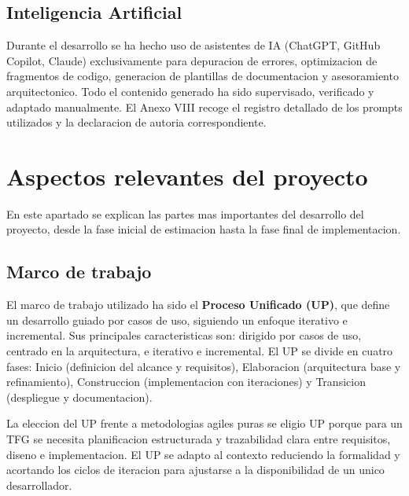 \documentclass[11pt, a4paper]{article}
\begin{document}
\subsection{Inteligencia Artificial}

Durante el desarrollo se ha hecho uso de asistentes de IA (ChatGPT, GitHub Copilot, Claude) exclusivamente para depuracion de errores, optimizacion de fragmentos de codigo, generacion de plantillas de documentacion y asesoramiento arquitectonico. Todo el contenido generado ha sido supervisado, verificado y adaptado manualmente. El Anexo VIII recoge el registro detallado de los prompts utilizados y la declaracion de autoria correspondiente.


\section{Aspectos relevantes del proyecto}

En este apartado se explican las partes mas importantes del desarrollo del proyecto, desde la fase inicial de estimacion hasta la fase final de implementacion.

\subsection{Marco de trabajo}

El marco de trabajo utilizado ha sido el \textbf{Proceso Unificado (UP)}, que define un desarrollo guiado por casos de uso, siguiendo un enfoque iterativo e incremental. Sus principales caracteristicas son: dirigido por casos de uso, centrado en la arquitectura, e iterativo e incremental. El UP se divide en cuatro fases: Inicio (definicion del alcance y requisitos), Elaboracion (arquitectura base y refinamiento), Construccion (implementacion con iteraciones) y Transicion (despliegue y documentacion).

La eleccion del UP frente a metodologias agiles puras se eligio UP porque para un TFG se necesita planificacion estructurada y trazabilidad clara entre requisitos, diseno e implementacion. El UP se adapto al contexto reduciendo la formalidad y acortando los ciclos de iteracion para ajustarse a la disponibilidad de un unico desarrollador.
\end{document}
